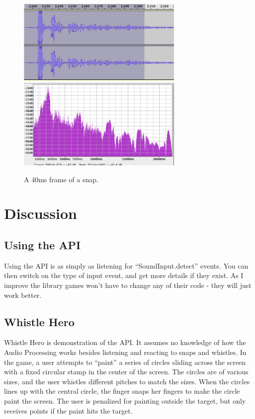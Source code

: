\documentclass[DIV=calc, paper=a4, fontsize=11pt, twocolumn]{scrartcl}   %
\begin{document}
    \begin{figure}[h]
   \centering
   \includegraphics[width=80mm]{figures/snapTimeDomainFrame.png}
   \includegraphics[width=80mm]{figures/SnapFreqDomainFrame.png}
   \caption{A 40ms frame of a snap. }
   \label{overflow}

\end{figure}


\section{Discussion}
   \subsection{Using the API}
      Using the API is as simply as listening for ``SoundInput.detect'' events. You can then switch on the type of input event, and get more details if they exist. As I improve the library games won't have to change any of their code - they will just work better.
   \subsection{Whistle Hero}
   Whistle Hero is demonstration of the API. It assumes no knowledge of how the Audio Processing works besides listening and reacting to snaps and whistles. In the game, a user attempts to ``paint'' a series of circles sliding across the screen with a fixed circular stamp in the center of the screen. The circles are of various sizes, and the user whistles different pitches to match the sizes. When the circles lines up with the central circle, the finger snaps her fingers to make the circle paint the screen. The user is penalized for painting outside the target, but only receives points if the paint hits the target.
\end{document}
